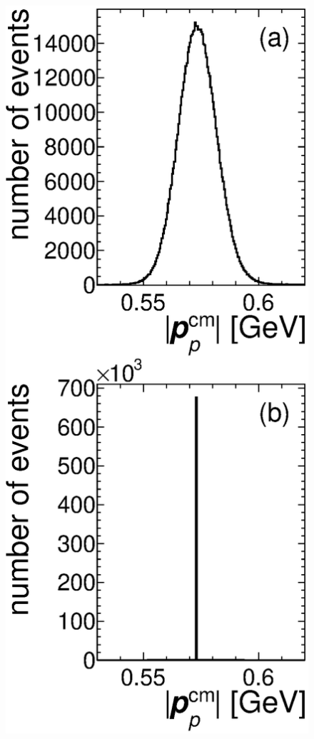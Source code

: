 \begin{figure}[htbp]\centering
\includegraphics[height=0.3\textheight]{pics/drawMom.eps}

\end{figure}
